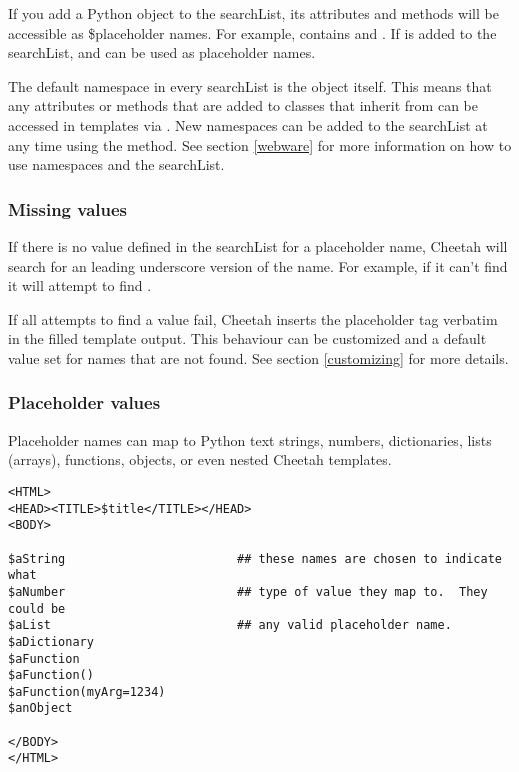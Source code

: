 If you add a Python object to the searchList, its attributes and methods will be
accessible as \$placeholder names.  For example,  contains
 and .  If  is added to the
searchList,  and  can be used as placeholder
names.  

The default namespace in every searchList is the  object itself.
This means that any attributes or methods that are added to classes that inherit
from  can be accessed in templates via .  New
namespaces can be added to the searchList at any time using the
 method.  See section \ref{webware} for more
information on how to use namespaces and the searchList.

\subsubsection{Missing values}
\label{TDL.placeholders.missing}

If there is no value defined in the searchList for a placeholder name,
Cheetah will search for an leading underscore version of the name.  For
example, if it can't find  it will attempt to find
.  

If all attempts to find a value fail, Cheetah inserts the placeholder tag
verbatim in the filled template output.  This behaviour can be customized and a
default value set for names that are not found.  See section
\ref{customizing} for more details.

\subsubsection{Placeholder values}
\label{TDL.placeholders.values}

Placeholder names can map to Python text strings, numbers, dictionaries, lists
(arrays), functions, objects, or even nested Cheetah templates.  

\begin{verbatim}
<HTML>
<HEAD><TITLE>$title</TITLE></HEAD>
<BODY>

$aString                        ## these names are chosen to indicate what
$aNumber                        ## type of value they map to.  They could be
$aList                          ## any valid placeholder name.
$aDictionary
$aFunction
$aFunction()
$aFunction(myArg=1234)
$anObject

</BODY>
</HTML>
\end{verbatim}

